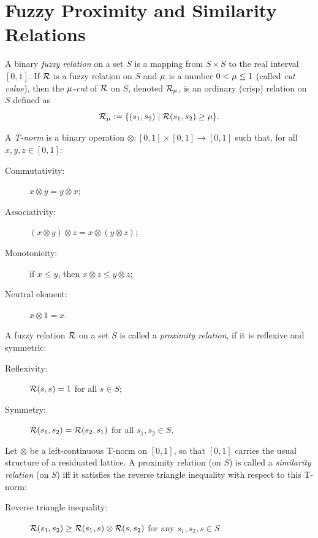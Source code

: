 \section{Fuzzy Proximity and Similarity Relations}


A binary \emph{fuzzy relation} on a set $S$ is a mapping from $S\times S$ to the real interval $[0,1]$. If ${\mathcal R}$ is a fuzzy relation on $S$ and $\mu$ is a number $0<\mu \le 1$ (called \emph{cut value}), then the \emph{$\mu$-cut} of ${\mathcal R}$ on $S$, denoted ${\mathcal R}_\mu$, is an ordinary (crisp) relation on $S$ defined as
\[
  {\mathcal R}_\mu := \{(s_1,s_2) \mid {\mathcal R}(s_1,s_2) \ge \mu \}.
\]

\begin{definition}[T-norm]
A \emph{T-norm} is a binary operation
$\otimes:[0,1]\times[0,1]\to[0,1]$ such that, for all
$x,y,z\in[0,1]$:
\begin{description}
  \item[Commutativity:] $x\otimes y = y\otimes x$;
  \item[Associativity:] $(x\otimes y)\otimes z = x\otimes (y\otimes z)$;
  \item[Monotonicity:] if $x\le y$, then $x\otimes z \le y\otimes z$;
  \item[Neutral element:] $x\otimes 1 = x$.
\end{description}
\end{definition}


A fuzzy relation ${\mathcal R}$ on a set $S$ is called a \emph{proximity relation}, if it is reflexive and symmetric:
\begin{description}
  \item[Reflexivity:] ${\mathcal R}(s,s)=1$ for all $s\in S$;
  \item[Symmetry:] ${\mathcal R}(s_1,s_2)={\mathcal R}(s_2,s_1)$ for all $s_1,s_2\in S$.
\end{description}

Let $\otimes$ be a left-continuous T-norm on $[0,1]$, so that $[0,1]$ carries
the usual structure of a residuated lattice. A proximity relation (on $S$) is
called a \emph{similarity relation} (on $S$) iff it satisfies the reverse
triangle inequality with respect to this T-norm:
\begin{description}
  \item[Reverse triangle inequality:] ${\mathcal R}(s_1,s_2)\ge {\mathcal R}(s_1,s) \otimes {\mathcal R}(s,s_2)$ for any $s_1,s_2,s\in S$.
\end{description}


